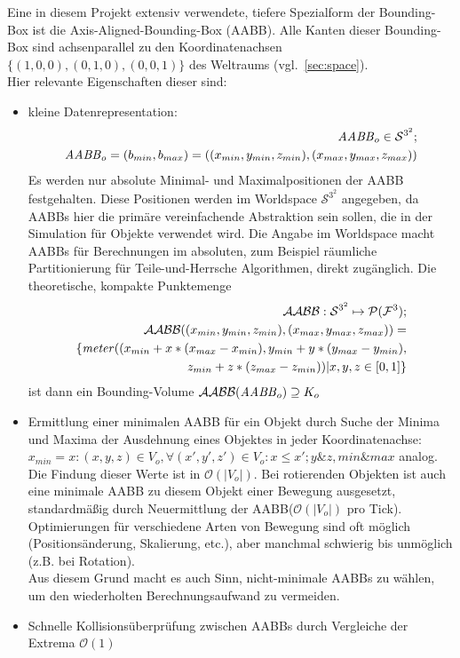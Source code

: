 \label{sec:aabb}
\label{sec:AABB}
Eine in diesem Projekt extensiv verwendete, tiefere Spezialform der Bounding-Box ist die Axis-Aligned-Bounding-Box (AABB). Alle Kanten dieser Bounding-Box sind achsenparallel zu den Koordinatenachsen $\{(1,0,0), (0,1,0), (0,0,1)\}$ des Weltraums (vgl.~\ref{sec:space}).\\
Hier relevante Eigenschaften dieser sind:
\begin{itemize}
\item kleine Datenrepresentation:
\begin{align}
\mathit{AABB}_o \in \mathcal{S}^{3^2};\\
\mathit{AABB}_o = (b_{min}, b_{max}) = ((x_{min}, y_{min}, z_{min}), (x_{max}, y_{max}, z_{max}))
\end{align}
		 Es werden nur absolute Minimal- und Maximalpositionen der AABB festgehalten.
		 Diese Positionen werden im Worldspace $\mathcal{S}^{3^2}$ angegeben, da AABBs hier die primäre vereinfachende Abstraktion sein sollen, die in der Simulation für Objekte verwendet wird. Die Angabe im Worldspace macht AABBs für Berechnungen im absoluten, zum Beispiel räumliche Partitionierung für Teile-und-Herrsche Algorithmen, direkt zugänglich.
		 Die theoretische, kompakte Punktemenge 
		 \begin{align}
		 \mathcal{AABB}: \mathcal{S}^{3^2} \mapsto \mathcal{P}(\mathcal{F}^3);\\
		 \mathcal{AABB} ((x_{min}, y_{min}, z_{min}), (x_{max}, y_{max}, z_{max})) = \\
		 \{\mathit{meter}((x_{min} + x * (x_{max} - x_{min}), y_{min} + y * (y_{max} - y_{min}),\\
		  z_{min} + z * (z_{max} - z_{min}))| x, y, z \in [0,1] \} 
		 \end{align}
		 ist dann ein Bounding-Volume $\mathcal{AABB}(\mathit{AABB}_o) \supseteq K_o$
	\item Ermittlung einer minimalen AABB für ein Objekt durch Suche der Minima und Maxima der Ausdehnung eines Objektes in jeder Koordinatenachse:
	 $x_{min} = x : (x, y, z) \in V_o , \forall (x', y', z') \in V_o: x \leq x'; y \& z, min \& max $ analog.
	 Die Findung dieser Werte ist in $ \mathcal{O}(|V_o|) $.
		Bei rotierenden Objekten ist auch eine minimale AABB zu diesem Objekt einer Bewegung ausgesetzt, standardmäßig durch Neuermittlung der AABB($\mathcal{O}(|V_o|)$ pro Tick). Optimierungen für verschiedene Arten von Bewegung sind oft möglich (Positionsänderung, Skalierung, etc.), aber manchmal schwierig bis unmöglich (z.B. bei Rotation).\\
		Aus diesem Grund macht es auch Sinn, nicht-minimale AABBs zu wählen, um den wiederholten Berechnungsaufwand zu vermeiden.
	\item Schnelle Kollisionsüberprüfung zwischen AABBs durch Vergleiche der Extrema $\mathcal{O}(1)$
\end{itemize}

